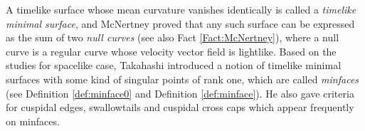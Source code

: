 \documentclass[11pt,reqno]{amsart}
\theoremstyle{plain} %
\theoremstyle{definition}
\begin{document}
A timelike surface whose mean curvature vanishes identically is called a {\it timelike minimal surface}, and McNertney \cite{McNertney} proved that any such surface can be expressed as the sum of two {\it null curves} (see also Fact \ref{Fact:McNertney}), where a null curve is a regular curve whose velocity vector field is lightlike. %
Based on the studies \cite{FSUY, UY} for spacelike case, Takahashi \cite{T} introduced a notion of timelike minimal surfaces with some kind of singular points of rank one, which are called {\it minfaces} (see Definition \ref{def:minface0} and Definition \ref{def:minface}). %
He also gave criteria for cuspidal edges, swallowtails and cuspidal cross caps which appear frequently on minfaces.%
 
\end{document}
